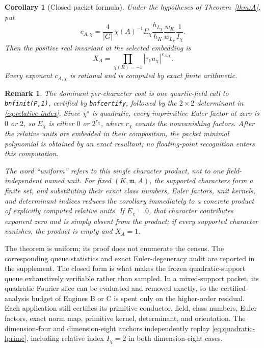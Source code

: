 \documentclass[11pt]{article}
\newtheorem{corollary}[theorem]{Corollary}
\newtheorem{remark}[theorem]{Remark}
\begin{document}
\begin{corollary}[Closed packet formula]\label{cor:Aclosed}
Under the hypotheses of Theorem~\ref{thm:A}, put
\[
 c_{A,\chi}
 =\frac{4}{|G|}\,\chi(A)^{-1}E_\chi
   \frac{h_{L_\chi}}{h_K}
   \frac{w_K}{w_{L_\chi}}
   \frac1{I_\chi}.
\]
Then the positive real invariant at the selected embedding is
\[
 \boxed{\qquad
 X_A=\prod_{\chi(R)=-1}
       |\tau_1u_\chi|^{\,c_{A,\chi}}.
 \qquad}
\]
Every exponent \(c_{A,\chi}\) is rational and is computed by exact
finite arithmetic.
\end{corollary}

\begin{remark}
The dominant per-character cost is one quartic-field call to
\texttt{bnfinit(P,1)}, certified by \texttt{bnfcertify}, followed by
the \(2\times2\) determinant in \eqref{eq:relative-index}.  Since
\(\chi^\circ\) is quadratic, every imprimitive Euler factor at zero
is \(0\) or \(2\), so \(E_\chi\) is either \(0\) or
\(2^{r_\chi}\), where \(r_\chi\) counts the nonvanishing factors.
After the relative units are embedded in their compositum, the packet
minimal polynomial is obtained by an exact resultant; no
floating-point recognition enters this computation.

The word ``uniform'' refers to this single character product, not to
one field-independent named unit.  For fixed
\((K,\mathfrak m,A)\), the supported characters form a finite set,
and substituting their exact class numbers, Euler factors, unit
kernels, and determinant indices reduces the corollary immediately
to a concrete product of explicitly computed relative units.
If \(E_\chi=0\), that character contributes exponent zero and is
simply absent from the product; if every supported character
vanishes, the product is empty and \(X_A=1\).
\end{remark}

The theorem is uniform; its proof does not enumerate the census.
The corresponding queue statistics and exact Euler-degeneracy audit
are reported in the supplement.  The closed form is what makes the
frozen quadratic-support queue exhaustively verifiable rather than
sampled.  In a mixed-support packet, its quadratic Fourier slice can
be evaluated and removed exactly, so the certified-analysis budget of
Engines B or C is spent only on the higher-order residual.  Each
application still certifies its
primitive conductor, field, class numbers, Euler factors, exact norm
map, primitive kernel, determinant, and orientation.  The
dimension-four and dimension-eight anchors independently replay
\eqref{eq:quadratic-lprime},
including relative index \(I_\chi=2\) in both dimension-eight cases.
\end{document}
